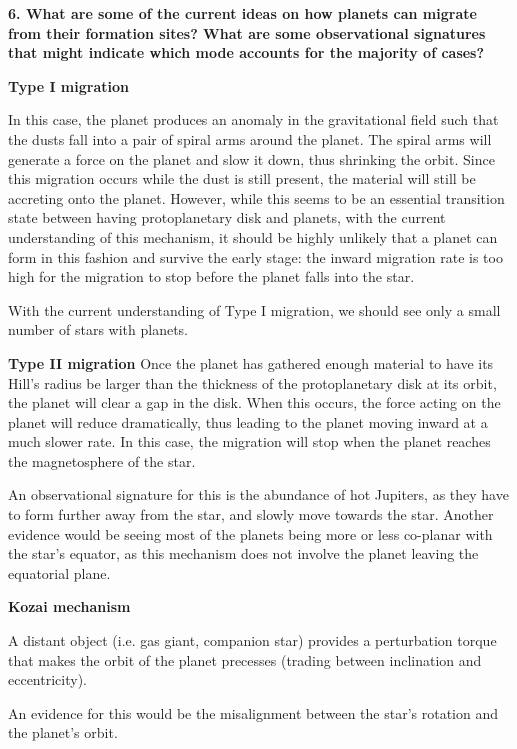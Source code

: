 \documentclass[12pt,preprint]{aastex61}
\begin{document}
{\bf 6. What are some of the current ideas on how planets can migrate from their formation sites? What are some observational signatures that might indicate which mode accounts for the majority of cases?}

{\bf Type I migration} 

In this case, the planet produces an anomaly in the gravitational field such that the dusts fall into a pair of spiral arms around the planet. The spiral arms will generate a force on the planet and slow it down, thus shrinking the orbit. Since this migration occurs while the dust is still present, the material will still be accreting onto the planet. However, while this seems to be an essential transition state between having protoplanetary disk and planets, with the current understanding of this mechanism, it should be highly unlikely that a planet can form in this fashion and survive the early stage: the inward migration rate is too high for the migration to stop before the planet falls into the star. 

With the current understanding of Type I migration, we should see only a small number of stars with planets.

{\bf Type II migration}
Once the planet has gathered enough material to have its Hill's radius be larger than the thickness of the protoplanetary disk at its orbit, the planet will clear a gap in the disk. When this occurs, the force acting on the planet will reduce dramatically, thus leading to the planet moving inward at a much slower rate. In this case, the migration will stop when the planet reaches the magnetosphere of the star. 

An observational signature for this is the abundance of hot Jupiters, as they have to form further away from the star, and slowly move towards the star. Another evidence would be seeing most of the planets being more or less co-planar with the star's equator, as this mechanism does not involve the planet leaving the equatorial plane.
 
 
{\bf Kozai mechanism}

A distant object (i.e. gas giant, companion star) provides a perturbation torque that makes the orbit of the planet precesses (trading between inclination and eccentricity).

An evidence for this would be the misalignment between the star's rotation and the planet's orbit.
\end{document}
